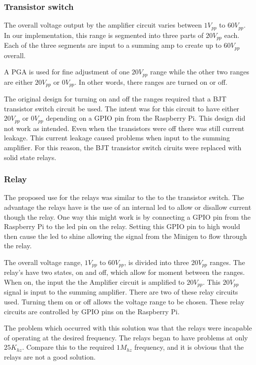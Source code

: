 \documentclass{article}	%
\begin{document}
\begin{multicols}{2}
\subsubsection{Transistor switch}
The overall voltage output by the amplifier circuit
varies between $1V_{pp}$ to $60V_{pp}$.
In our implementation,
this range is segmented into three parts of $20V_{pp}$ each.
Each of the three segments are input to a summing amp to
create up to $60V_{pp}$ overall.

A PGA is used for fine adjustment of one $20V_{pp}$ range while
the other two ranges are either $20V_{pp}$ or $0V_{pp}$.
In other words,
there ranges are turned on or off.

The original design for turning on and off the ranges
required that a BJT transistor switch circuit be used.
The intent was for this circuit to have either $20V_{pp}$ or $0V_{pp}$
depending on a GPIO pin from the Raspberry Pi.
This design did not work as intended.
Even when the transistors were off there was still current leakage.
This current leakage caused problems when input to the summing amplifier.
For this reason, the BJT transistor switch ciruits were replaced with solid state relays.

\subsubsection{Relay}
The proposed use for the relays was
similar to the to the transistor switch.
The advantage the relays have is the use
of an internal led to allow or disallow
current though the relay.
One way this might work is by
connecting a GPIO pin from the Raspberry Pi to
the led pin on the relay.
Setting this GPIO pin to high would then
cause the led to shine allowing the signal
from the Minigen to flow through the relay.

The overall voltage range,
$1V_{pp}$ to $60V_{pp}$,
is divided into three $20V_{pp}$ ranges.
The relay's have two states,
on and off,
which allow for moment between the ranges.
When on,
the input the the Amplifier circuit is amplified to $20V_{pp}$.
This $20V_{pp}$ signal is input to the summing amplifier.
There are two of these relay circuits used.
Turning them on or off allows the voltage range to be chosen.
These relay circuits are controlled by 
GPIO pins on the Raspberry Pi.

The problem which occurred with this solution
was that the relays were incapable of
operating at the desired frequency.
The relays began to have problems at only $25K_{hz}$.
Compare this to the required $1M_{hz}$ frequency, and
it is obvious that the relays are not a good solution.


\end{multicols}
\end{document}
